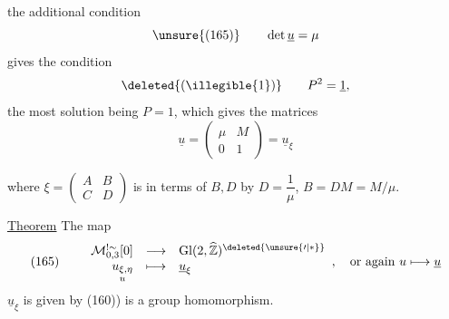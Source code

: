 the additional condition
\[
\unsure{(165)}\qquad \det\underline u=\mu
\]
gives the condition
\[
\deleted{(\illegible{1})}\qquad P^2=\underline 1,
\]
the most  solution being $P=1$,
which gives  the matrices
\[
\underline u=\begin{pmatrix}\mu&M\\0&1\end{pmatrix}
=\underline u_\xi
\]


where $\xi=\begin{pmatrix}A&B\\C&D\end{pmatrix}$
 is  in terms of
$B,D$ by $D=\dfrac1\mu$, $B=DM=M/\mu$.

\uline{Theorem} The map
\[
(165)\qquad
\begin{array}{rcl}
\mathcal M_{0,3}^{!\sim}[0]&\longrightarrow&
\mathrm{Gl}(2,\widehat{\mathbb Z})^{\deleted{\unsure{\prime|*}}}\\
\underset{u}{u_{\xi,\eta}}&\longmapsto&\underline u_\xi
\end{array},
\quad\text{or again }u\longmapsto\underline u
\]
$\underline u_\xi$ is given by (160)) is a group homomorphism.



